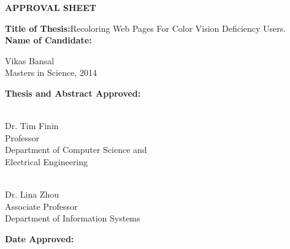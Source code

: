 \newpage
\begin{titlepage}
\vspace{0.6in}
\begin{singlespace}

\begin{center}
\vspace{0.1in}
\large{\bf APPROVAL SHEET}
\bigskip \bigskip
\end{center}

\begin{flushleft}
{\bf Title of Thesis:}{\hspace{3mm}}Recoloring Web Pages For Color Vision Deficiency Users.\\
\vspace{0.5in}
{\bf Name of Candidate:}{\hspace{3mm}} \parbox[t]{2in}{Vikas Bansal \\ Masters in Science, 2014}
\end{flushleft}

\vspace{0.5in}

\begin{flushleft}
{\bf Thesis and Abstract Approved:}{\hspace{3mm}} 
\parbox[t]{2.5in}{\underline{\hspace{2.0in}}\\ 
	Dr. Tim Finin\\
	Professor \\
	Department of Computer Science and \\
	Electrical Engineering}
\end{flushleft}
\vspace{0.5in}
\begin{flushleft}
{\hspace{59.9mm}}\parbox[t]{2.5in}{\underline{\hspace{2.0in}}\\ 
	Dr. Lina Zhou\\
	Associate Professor \\
	Department of Information Systems}
\end{flushleft}

\vspace{0.8in}

\begin{flushleft}
{\bf Date Approved:}{\hspace{3mm}} \underline{\hspace{2.5in}}\\
\end{flushleft}

\end{singlespace}
\end{titlepage}
\par\vfil
